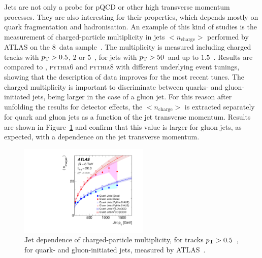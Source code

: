 \documentclass{PoS}
\providecommand{\PYTHIAS} {{\textsc{pythia6}}\xspace}
\providecommand{\PYTHIAE} {{\textsc{pythia8}}\xspace}
\begin{document}
Jets are not only a probe for pQCD or other high transverse momentum processes. They are also interesting for their
properties, which depends mostly on quark fragmentation and hadronisation. An example of this kind of studies is the
measurement of charged-particle multiplicity in jets $<n_\mathrm{charge}>$ performed by ATLAS on the 8~\TeV data sample~\cite{Aad:2016oit}.
The multiplicity is measured including charged tracks with $p_{\mathrm{T}} > 0.5$, 2 or 5~\GeV, for jets with $p_{\mathrm{T}} > 50$~\GeV and up to
$1.5$~\TeV. Results are compared to \HERWIGpp, \PYTHIAS and \PYTHIAE with different underlying event tunings, showing
that the description of data improves for the most recent tunes. 
The charged multiplicity is important to discriminate between quarks- and gluon-initiated jets, being larger in the case
of a gluon jet. For this reason after unfolding the results for detector effects, the  $<n_\mathrm{charge}>$ is
extracted separately for quark and gluon jets as a function of the jet transverse momentum. Results are shown in
Figure~\ref{fig:chargemult} and confirm that this value is larger for gluon jets, as expected, with a dependence on the jet transverse
momentum.
\begin{figure}[hbtp]
  \centering
  \includegraphics[width=0.55\textwidth]{Figure9.pdf}
  \caption{Jet \pt dependence of charged-particle multiplicity, for tracks $p_{\mathrm{T}} > 0.5$~\GeV, for quark- and
    gluon-initiated jets, measured by ATLAS~\cite{Aad:2016oit}.}
  \label{fig:chargemult}
\end{figure}
\end{document}

